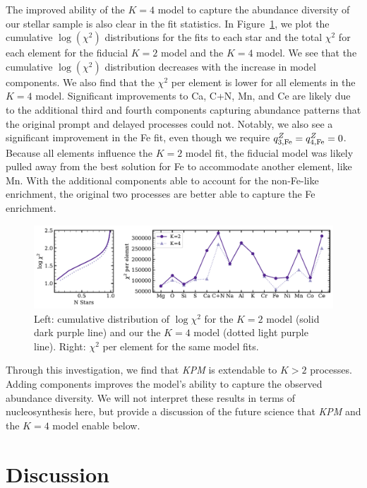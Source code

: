 \documentclass[modern]{aastex631}
\newcommand{\name}{\textsl{KPM}}
\begin{document}
The improved ability of the $K=4$ model to capture the abundance diversity of our stellar sample is also clear in the fit statistics. In Figure~\ref{fig:comp_Ks}, we plot the cumulative $\log(\chi^2)$ distributions for the fits to each star and the total $\chi^2$ for each element for the fiducial $K=2$ model and the $K=4$ model. We see that the cumulative $\log(\chi^2)$ distribution decreases with the increase in model components. We also find that the $\chi^2$ per element is lower for all elements in the $K=4$ model. Significant improvements to Ca, C+N, Mn, and Ce are likely due to the additional third and fourth components capturing abundance patterns that the original prompt and delayed processes could not. Notably, we also see a significant improvement in the Fe fit, even though we require $q_{\rm 3,Fe}^{Z} = q_{\rm 4,Fe}^{Z} = 0$. Because all elements influence the $K=2$ model fit, the fiducial model was likely pulled away from the best solution for Fe to accommodate another element, like Mn. With the additional components able to account for the non-Fe-like enrichment, the original two processes are better able to capture the Fe enrichment. 

\begin{figure}[htb!]
    \centering
    \includegraphics[width=\textwidth]{Paper/Figures/comp_Ks.pdf}
    \caption{Left: cumulative distribution of $\log \chi^2$ for the $K=2$ model (solid dark purple line) and our the $K=4$ model (dotted light purple line). Right: $\chi^2$ per element for the same model fits.}
    \label{fig:comp_Ks}
\end{figure}

Through this investigation, we find that \name{} is extendable to $K>2$ processes. Adding components improves the model's ability to capture the observed abundance diversity. We will not interpret these results in terms of nucleosynthesis here, but provide a discussion of the future science that \name{} and the $K=4$ model enable below.

\section{Discussion}\label{sec:discussion}
\end{document}
